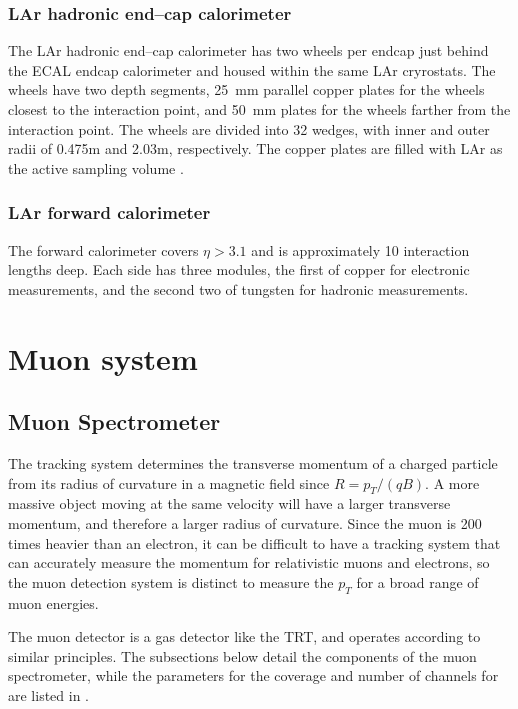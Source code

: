 \subsubsection{LAr hadronic end--cap calorimeter}
The LAr hadronic end--cap calorimeter has two wheels per endcap just behind the ECAL endcap calorimeter and housed within the same LAr cryrostats.
The wheels have two depth segments, 25~mm parallel copper plates for the wheels closest to the interaction point, and 50~mm plates for the wheels farther from the interaction point.  The wheels are divided into 32 wedges, with inner and outer radii of 0.475m and 2.03m, respectively.  The copper plates are filled with LAr as the active sampling volume \cite{ATLAS_long}.

\subsubsection{LAr forward calorimeter}
The forward calorimeter covers $\eta >3.1$ and is approximately 10 interaction lengths deep.
Each side has three modules, the first of copper
 for electronic measurements, and the second two of tungsten for hadronic measurements.

\section{Muon system}

\subsection{Muon Spectrometer}

The tracking system determines the transverse momentum of a charged particle from its radius of curvature in a magnetic field since $R = p_T /(qB)$.  A more massive object moving at the same velocity will have a larger transverse momentum, and therefore a larger radius of curvature.  Since the muon is 200 times heavier than an electron, it can be difficult to have a tracking system that can accurately measure the momentum for relativistic muons and electrons, so the muon detection system is distinct to measure the $p_T$ for a broad range of muon energies.  

The muon detector is a gas detector like the TRT, and operates according to similar principles. 
The subsections below detail the components of the muon spectrometer, while the parameters for the coverage and number of channels for are listed in .

